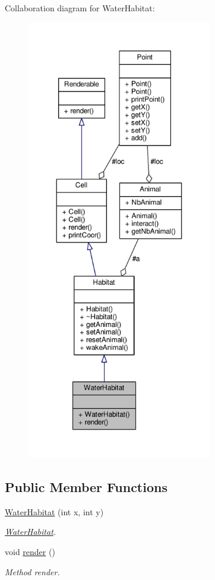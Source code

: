 Collaboration diagram for Water\+Habitat\+:
\nopagebreak
\begin{figure}[H]
\begin{center}
\leavevmode
\includegraphics[height=550pt]{classWaterHabitat__coll__graph}
\end{center}
\end{figure}
\subsection*{Public Member Functions}
\begin{DoxyCompactItemize}
\item 
\hyperlink{classWaterHabitat_a983ed93066b800c49d952aef0ad090a9}{Water\+Habitat} (int x, int y)
\begin{DoxyCompactList}\small\item\em \hyperlink{classWaterHabitat}{Water\+Habitat}. \end{DoxyCompactList}\item 
void \hyperlink{classWaterHabitat_a0820a384777ce7ba41244494e76eae13}{render} ()\hypertarget{classWaterHabitat_a0820a384777ce7ba41244494e76eae13}{}\label{classWaterHabitat_a0820a384777ce7ba41244494e76eae13}

\begin{DoxyCompactList}\small\item\em Method render. \end{DoxyCompactList}\end{DoxyCompactItemize}

